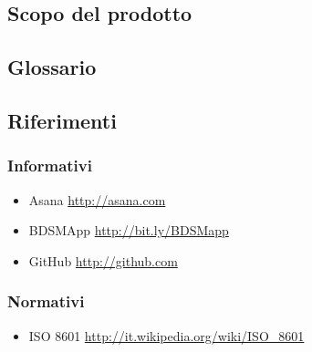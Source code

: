 \subsection{Scopo del prodotto}
	\productScope

\subsection{Glossario}
	\glossarioDesc

\subsection{Riferimenti}

\subsubsection{Informativi}
\begin{itemize}
\item Asana \url{http://asana.com}
\item BDSMApp \url{http://bit.ly/BDSMapp}
\item GitHub \url{http://github.com}
\end{itemize}

\subsubsection{Normativi}
\begin{itemize}
\item ISO 8601 \url{http://it.wikipedia.org/wiki/ISO_8601}
\end{itemize}